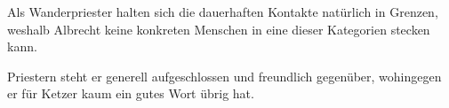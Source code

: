 
Als Wanderpriester halten sich die dauerhaften Kontakte natürlich in Grenzen, weshalb Albrecht keine konkreten Menschen in eine dieser Kategorien stecken kann.

Priestern steht er generell aufgeschlossen und freundlich gegenüber, wohingegen er für Ketzer kaum ein gutes Wort übrig hat.